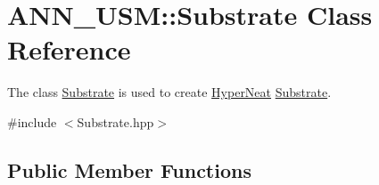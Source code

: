 \hypertarget{class_a_n_n___u_s_m_1_1_substrate}{\section{A\-N\-N\-\_\-\-U\-S\-M\-:\-:Substrate Class Reference}
\label{class_a_n_n___u_s_m_1_1_substrate}
}


The class \hyperlink{class_a_n_n___u_s_m_1_1_substrate}{Substrate} is used to create \hyperlink{class_a_n_n___u_s_m_1_1_hyper_neat}{Hyper\-Neat} \hyperlink{class_a_n_n___u_s_m_1_1_substrate}{Substrate}.  




{\ttfamily \#include $<$Substrate.\-hpp$>$}

\subsection*{Public Member Functions}
